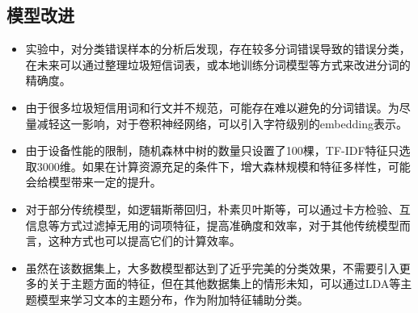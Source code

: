\documentclass[a4paper]{article}
\begin{document}
\subsection{模型改进}
\begin{itemize}
    \item 实验中，对分类错误样本的分析后发现，存在较多分词错误导致的错误分类，在未来可以通过整理垃圾短信词表，或本地训练分词模型等方式来改进分词的精确度。
    \item 由于很多垃圾短信用词和行文并不规范，可能存在难以避免的分词错误。为尽量减轻这一影响，对于卷积神经网络，可以引入字符级别的embedding表示。
    \item 由于设备性能的限制，随机森林中树的数量只设置了100棵，TF-IDF特征只选取3000维。如果在计算资源充足的条件下，增大森林规模和特征多样性，可能会给模型带来一定的提升。
    \item 对于部分传统模型，如逻辑斯蒂回归，朴素贝叶斯等，可以通过卡方检验、互信息等方式过滤掉无用的词项特征，提高准确度和效率，对于其他传统模型而言，这种方式也可以提高它们的计算效率。
    \item 虽然在该数据集上，大多数模型都达到了近乎完美的分类效果，不需要引入更多的关于主题方面的特征，但在其他数据集上的情形未知，可以通过LDA等主题模型来学习文本的主题分布，作为附加特征辅助分类。
\end{itemize}




\clearpage

\end{document}
